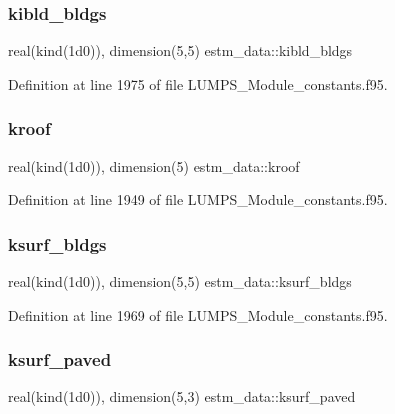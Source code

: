 \subsubsection{\texorpdfstring{kibld\+\_\+bldgs}{kibld\_bldgs}}
{\footnotesize\ttfamily real(kind(1d0)), dimension(5,5) estm\+\_\+data\+::kibld\+\_\+bldgs}



Definition at line 1975 of file L\+U\+M\+P\+S\+\_\+\+Module\+\_\+constants.\+f95.

\mbox{\label{namespaceestm__data_a4a6dc37f5a42699f54da6bd130191c07}} 
\subsubsection{\texorpdfstring{kroof}{kroof}}
{\footnotesize\ttfamily real(kind(1d0)), dimension(5) estm\+\_\+data\+::kroof}



Definition at line 1949 of file L\+U\+M\+P\+S\+\_\+\+Module\+\_\+constants.\+f95.

\mbox{\label{namespaceestm__data_af810783ea0a93838a243c98f96300d07}} 
\subsubsection{\texorpdfstring{ksurf\+\_\+bldgs}{ksurf\_bldgs}}
{\footnotesize\ttfamily real(kind(1d0)), dimension(5,5) estm\+\_\+data\+::ksurf\+\_\+bldgs}



Definition at line 1969 of file L\+U\+M\+P\+S\+\_\+\+Module\+\_\+constants.\+f95.

\mbox{\label{namespaceestm__data_ad0be589bd6851290e89cc3c869fce8ee}} 
\subsubsection{\texorpdfstring{ksurf\+\_\+paved}{ksurf\_paved}}
{\footnotesize\ttfamily real(kind(1d0)), dimension(5,3) estm\+\_\+data\+::ksurf\+\_\+paved}



